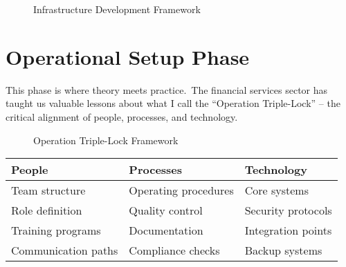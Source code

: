 \begin{figure}[htbp]
    \centering
    \caption{Infrastructure Development Framework}
    \label{fig:infrastructure-framework}
\end{figure}

\section{Operational Setup Phase}\label{sec:operational-setup}

This phase is where theory meets practice.\ The financial services sector has taught us valuable lessons about what I call the ``Operation Triple-Lock'' – the critical alignment of people, processes, and technology.

\begin{figure}[htbp]
    \centering
    \caption{Operation Triple-Lock Framework}
    \label{fig:triple-lock-framework}
\end{figure}

\begin{tcolorbox}[colback=white,colframe=primarydark,title=\textbf{Operational Setup Matrix}]
\begin{center}
\begin{tabularx}{\textwidth}{>{\raggedright\arraybackslash}X >{\raggedright\arraybackslash}X >{\raggedright\arraybackslash}X}
    \toprule
    \textbf{People} & \textbf{Processes} & \textbf{Technology} \\
    \midrule
    Team structure & Operating procedures & Core systems \\
    Role definition & Quality control & Security protocols \\
    Training programs & Documentation & Integration points \\
    Communication paths & Compliance checks & Backup systems \\
    \bottomrule
\end{tabularx}
\end{center}
\end{tcolorbox}

